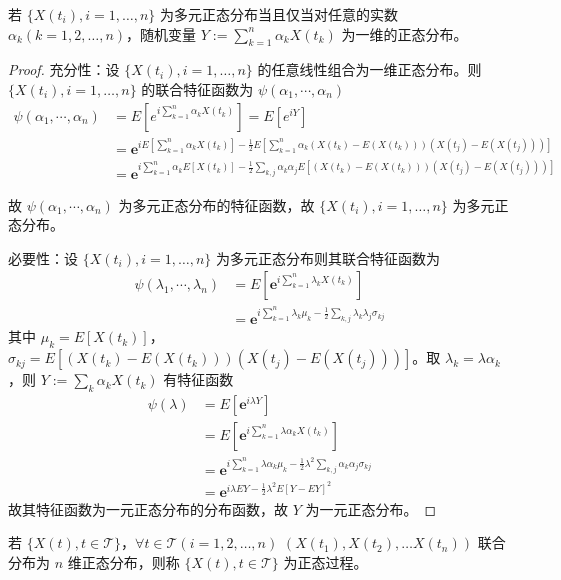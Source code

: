 \documentclass[lang=cn,10pt,thmcnt=section]{elegantbook}
\begin{document}
\begin{theorem}
	若 $\{X(t_i), i = 1, \ldots, n\}$ 为多元正态分布当且仅当对任意的实数 $\alpha_k (k = 1, 2, \ldots, n)$，随机变量 $Y := \sum_{k=1}^{n} \alpha_k X(t_k)$ 为一维的正态分布。
\end{theorem}
\begin{proof}
	充分性：设 $\{X(t_i), i = 1, \ldots, n\}$ 的任意线性组合为一维正态分布。则 $\{X(t_i), i = 1, \ldots, n\}$ 的联合特征函数为 $\psi(\alpha_1, \cdots, \alpha_n)$
\begin{align*}
\psi(\alpha_1, \cdots, \alpha_n) &= E\left[e^{i \sum_{k=1}^{n} \alpha_k X(t_k)}\right] = E\left[e^{iY}\right] \\
&= \mathbf{e}^{iE\left[\sum_{k=1}^{n} \alpha_k X(t_k)\right] - \frac{1}{2} E\left[\sum_{k=1}^{n} \alpha_k (X(t_k) - E(X(t_k)))(X(t_j) - E(X(t_j)))\right]} \\
&= \mathbf{e}^{i \sum_{k=1}^{n} \alpha_k E[X(t_k)] - \frac{1}{2} \sum_{k,j} \alpha_k \alpha_j E[(X(t_k) - E(X(t_k)))(X(t_j) - E(X(t_j)))]}
\end{align*}

故 $\psi(\alpha_1, \cdots, \alpha_n)$ 为多元正态分布的特征函数，故 $\{X(t_i), i = 1, \ldots, n\}$ 为多元正态分布。

必要性：设 $\{X(t_i), i = 1, \ldots, n\}$ 为多元正态分布则其联合特征函数为
\begin{align*}
\psi(\lambda_1, \cdots, \lambda_n) &= E\left[\mathbf{e}^{i \sum_{k=1}^{n} \lambda_k X(t_k)}\right] \\
&= \mathbf{e}^{i \sum_{k=1}^{n} \lambda_k \mu_k - \frac{1}{2} \sum_{k,j} \lambda_k \lambda_j \sigma_{kj}}
\end{align*}
其中 $\mu_k = E[X(t_k)]$，$\sigma_{kj} = E[(X(t_k) - E(X(t_k)))(X(t_j) - E(X(t_j)))]$。取 $\lambda_k = \lambda \alpha_k$，则 $Y := \sum_{k} \alpha_k X(t_k)$ 有特征函数
\begin{align*}
\psi(\lambda) &= E\left[\mathbf{e}^{i \lambda Y}\right] \\
&= E\left[\mathbf{e}^{i \sum_{k=1}^{n} \lambda \alpha_k X(t_k)}\right] \\
&= \mathbf{e}^{i \sum_{k=1}^{n} \lambda \alpha_k \mu_k - \frac{1}{2} \lambda^2 \sum_{k,j} \alpha_k \alpha_j \sigma_{kj}} \\
&= \mathbf{e}^{i \lambda EY - \frac{1}{2} \lambda^2 E[Y - EY]^2}
\end{align*}
故其特征函数为一元正态分布的分布函数，故 $Y$ 为一元正态分布。
\end{proof}
\begin{definition}
	若 $\{X(t), t \in \mathcal{T}\}$，$\forall t \in \mathcal{T} (i = 1, 2, \ldots, n)$ $(X(t_1), X(t_2), \ldots X(t_n))$ 联合分布为 $n$ 维正态分布，则称 $\{X(t), t \in \mathcal{T}\}$ 为正态过程。
\end{definition}
\end{document}
